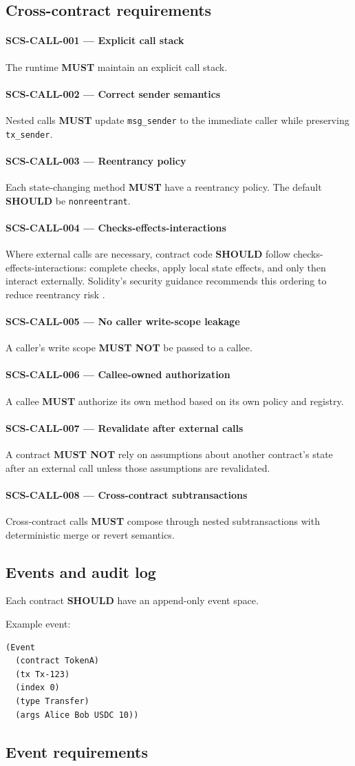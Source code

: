 \documentclass[11pt]{article}
\newcommand{\MUST}{\textbf{MUST}}
\newcommand{\MUSTNOT}{\textbf{MUST NOT}}
\newcommand{\SHOULD}{\textbf{SHOULD}}
\newcommand{\req}[2]{\paragraph{#1}#2\par}
\newcommand{\code}[1]{\texttt{#1}}
\begin{document}
\subsection{Cross-contract requirements}

\req{SCS-CALL-001 --- Explicit call stack}{The runtime \MUST{} maintain an explicit call stack.}

\req{SCS-CALL-002 --- Correct sender semantics}{Nested calls \MUST{} update \code{msg\_sender} to the immediate caller while preserving \code{tx\_sender}.}

\req{SCS-CALL-003 --- Reentrancy policy}{Each state-changing method \MUST{} have a reentrancy policy. The default \SHOULD{} be \code{nonreentrant}.}

\req{SCS-CALL-004 --- Checks-effects-interactions}{Where external calls are necessary, contract code \SHOULD{} follow checks-effects-interactions: complete checks, apply local state effects, and only then interact externally. Solidity's security guidance recommends this ordering to reduce reentrancy risk \cite{solidity-security}.}

\req{SCS-CALL-005 --- No caller write-scope leakage}{A caller's write scope \MUSTNOT{} be passed to a callee.}

\req{SCS-CALL-006 --- Callee-owned authorization}{A callee \MUST{} authorize its own method based on its own policy and registry.}

\req{SCS-CALL-007 --- Revalidate after external calls}{A contract \MUSTNOT{} rely on assumptions about another contract's state after an external call unless those assumptions are revalidated.}

\req{SCS-CALL-008 --- Cross-contract subtransactions}{Cross-contract calls \MUST{} compose through nested subtransactions with deterministic merge or revert semantics.}

\subsection{Events and audit log}

Each contract \SHOULD{} have an append-only event space.

Example event:

\begin{lstlisting}
(Event
  (contract TokenA)
  (tx Tx-123)
  (index 0)
  (type Transfer)
  (args Alice Bob USDC 10))
\end{lstlisting}

\subsection{Event requirements}
\end{document}
